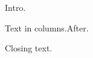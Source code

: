 \documentclass{article}\usepackage{setspace,lscape,multicol}
\begin{document}
Intro.

\begingroup{} Text in columns.\endgroup After.

Closing text.
\end{document}
